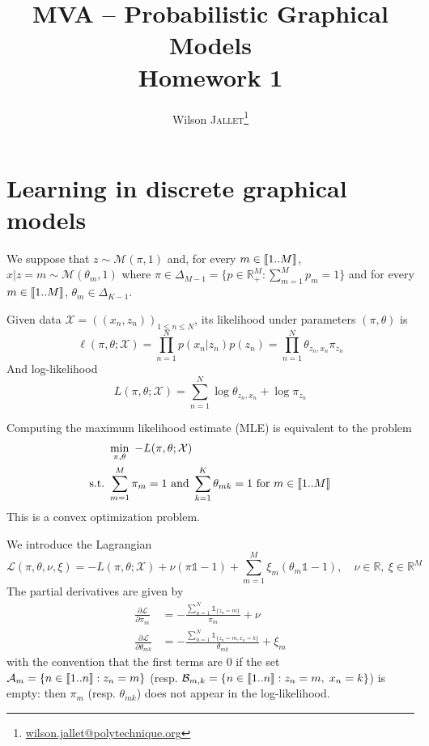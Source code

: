 \documentclass[11pt]{article}
\title{
	MVA -- Probabilistic Graphical Models\\
	{\color{NavyBlue}\sffamily Homework 1}
}
\author{
	Wilson \textsc{Jallet}\thanks{\url{wilson.jallet@polytechnique.org}}}
\newcommand\RR{\mathbb{R}}
\DeclarePairedDelimiter{\intinterv}{\llbracket}{\rrbracket}
\newcommand{\suchthat}{\mathrm{s.t.}}
\newcommand{\calM}{\mathcal{M}}
\newcommand{\calX}{\mathcal{X}}
\newcommand{\calL}{\mathcal{L}}
\begin{document}
\maketitle

\section{Learning in discrete graphical models}


We suppose that $z \sim \calM(\pi, 1)$ and, for every $m\in\intinterv{1..M}$, $x | z=m \sim \calM(\theta_m, 1)$ where $\pi \in \Delta_{M-1} = \{ p \in\RR_+^M : \sum_{m=1}^{M} p_m = 1 \}$ and for every $m \in \intinterv{1..M}$, $\theta_m \in \Delta_{K-1}$.

Given data $\calX = {((x_n, z_n))}_{1\leq n\leq N}$, its likelihood under parameters $(\pi, \theta)$ is
\begin{equation}
\ell(\pi, \theta; \calX) = 
\prod_{n=1}^N p(x_n|z_n) p(z_n) =
\prod_{n=1}^N \theta_{z_n,x_n} \pi_{z_n}
\end{equation}
And log-likelihood
\begin{equation}
L(\pi, \theta; \calX) =
\sum_{n=1}^N \log\theta_{z_n,x_n} + \log \pi_{z_n}
\end{equation}

Computing the maximum likelihood estimate (MLE) is equivalent to the problem
\begin{equation}
\begin{aligned}
&\min_{\pi,\theta}~ -L(\pi,\theta;\calX) \\
\suchthat \ &\sum_{m=1}^M \pi_m = 1 \text{ and }
			\sum_{k=1}^K \theta_{mk} = 1\ \text{for } m\in\intinterv{1..M}
\end{aligned}
\end{equation}
This is a convex optimization problem.

We introduce the Lagrangian
\[
	\calL(\pi, \theta, \nu, \xi) =
	-L(\pi,\theta;\calX) + \nu (\pi\mathds{1} - 1) + \sum_{m=1}^M \xi_m (\theta_m\mathds{1}-1), \quad
	\nu \in \RR, \ \xi\in\RR^M
\]
The partial derivatives are given by
\begin{align*}
	\frac{\partial\calL}{\partial \pi_m} &=
	-\frac{
		\sum_{n=1}^N \mathds{1}_{\{z_n=m\}}
	}{\pi_m}
	+ \nu \\
	\frac{\partial\calL}{\partial \theta_{mk}} &=
	-\frac{
		\sum_{n=1}^N \mathds{1}_{\{z_n=m,x_n=k\}}
	}{\theta_{mk}}
	+ \xi_m
\end{align*}
with the convention that the first terms are $0$ if the set $\mathcal{A}_m = \{n\in\intinterv{1..n}: z_n = m\}$ (resp. $\mathcal{B}_{m,k} = \{n\in\intinterv{1..n}: z_n=m,\; x_n=k\}$) is empty: then $\pi_m$ (resp. $\theta_{mk}$) does not appear in the log-likelihood.
\end{document}
